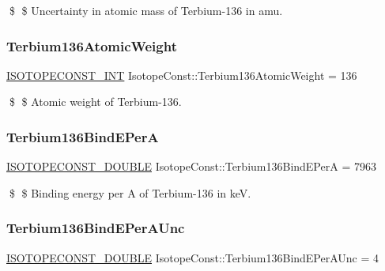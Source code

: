 \$ \$ Uncertainty in atomic mass of Terbium-\/136 in amu. \mbox{\label{group___isotope_const-_terbium-_tb136_ga97a69daf179ce38ecb408b6d50072371}} 
\subsubsection{\texorpdfstring{Terbium136\+Atomic\+Weight}{Terbium136AtomicWeight}}
{\footnotesize\ttfamily \mbox{\hyperlink{group___isotope_const-_macros_ga5f18360b3e99483a35c32d789e62621c}{I\+S\+O\+T\+O\+P\+E\+C\+O\+N\+S\+T\+\_\+\+I\+NT}} Isotope\+Const\+::\+Terbium136\+Atomic\+Weight = 136}

\$ \$ Atomic weight of Terbium-\/136. \mbox{\label{group___isotope_const-_terbium-_tb136_ga14a52ea194ce8ef816fe8571c5c51a7c}} 
\subsubsection{\texorpdfstring{Terbium136\+Bind\+E\+PerA}{Terbium136BindEPerA}}
{\footnotesize\ttfamily \mbox{\hyperlink{group___isotope_const-_macros_ga8f45a7272ce02c0b4c65c44636ed719a}{I\+S\+O\+T\+O\+P\+E\+C\+O\+N\+S\+T\+\_\+\+D\+O\+U\+B\+LE}} Isotope\+Const\+::\+Terbium136\+Bind\+E\+PerA = 7963}

\$ \$ Binding energy per A of Terbium-\/136 in keV. \mbox{\label{group___isotope_const-_terbium-_tb136_ga4b123bd5360aebd689a9f18f254ca5ec}} 
\subsubsection{\texorpdfstring{Terbium136\+Bind\+E\+Per\+A\+Unc}{Terbium136BindEPerAUnc}}
{\footnotesize\ttfamily \mbox{\hyperlink{group___isotope_const-_macros_ga8f45a7272ce02c0b4c65c44636ed719a}{I\+S\+O\+T\+O\+P\+E\+C\+O\+N\+S\+T\+\_\+\+D\+O\+U\+B\+LE}} Isotope\+Const\+::\+Terbium136\+Bind\+E\+Per\+A\+Unc = 4}

